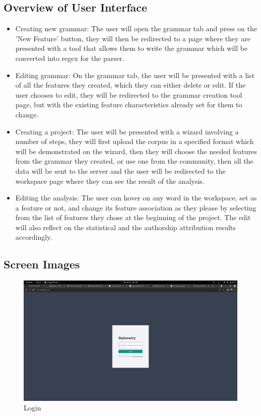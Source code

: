 \subsection {Overview of User Interface}
\begin{itemize}
    \item Creating new grammar: The user will open the grammar tab and press on the 'New Feature' button, they will then be redirected to a page where they are presented with a tool that allows them to write the grammar which will be converted into regex for the parser.
    \item Editing grammar: On the grammar tab, the user will be presented with a list of all the features they created, which they can either delete or edit. If the user chooses to edit, they will be redirected to the grammar creation tool page, but with the existing feature characteristics already set for them to change.
    \item Creating a project: The user will be presented with a wizard involving a number of steps, they will first upload the corpus in a specified format which will be demonstrated on the wizard, then they will choose the needed features from the grammar they created, or use one from the community, then all the data will be sent to the server and the user will be redirected to the workspace page where they can see the result of the analysis.
    \item Editing the analysis: The user can hover on any word in the workspace, set as a feature or not, and change its feature association as they please by selecting from the list of features they chose at the beginning of the project. The edit will also reflect on the statistical and the authorship attribution results accordingly.
\end{itemize}

\subsection {Screen Images}
\begin{figure}[H]
    \includegraphics[width=15cm]{images/Login.png}
    \caption{Login}
\end{figure}

